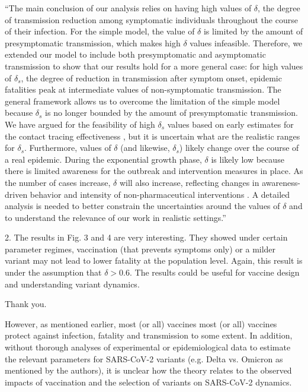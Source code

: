 \documentclass[12pt]{article}
\newcommand{\revtext}{\textsf}
\begin{document}
``The main conclusion of our analysis relies on having high values of $\delta$, the degree of transmission reduction among symptomatic individuals throughout the course of their infection.
For the simple model, the value of $\delta$ is limited by the amount of presymptomatic transmission, which makes high $\delta$ values infeasible.
Therefore, we extended our model to include both presymptomatic and asymptomatic transmission to show that our results hold for a more general case: for high values of $\delta_s$, the degree of reduction in transmission after symptom onset, epidemic fatalities peak at intermediate values of non-symptomatic transmission.
The general framework allows us to overcome the limitation of the simple model because $\delta_s$ is no longer bounded by the amount of presymptomatic transmission.
We have argued for the feasibility of high $\delta_s$ values based on early estimates for the contact tracing effectiveness \citep{kucharski2020effectiveness}, but it is uncertain what are the realistic ranges for $\delta_s$.
Furthermore, values of $\delta$ (and likewise, $\delta_s$) likely change over the course of a real epidemic.
During the exponential growth phase, $\delta$ is likely low because there is limited awareness for the outbreak and intervention measures in place.
As the number of cases increase, $\delta$ will also increase, reflecting changes in awareness-driven behavior and intensity of non-pharmaceutical interventions \citep{weitz2020awareness}.
A detailed analysis is needed to better constrain the uncertainties around the values of $\delta$ and to understand the relevance of our work in realistic settings.''

\revtext{2. The results in Fig. 3 and 4 are very interesting. They showed under certain parameter regimes, vaccination (that prevents symptoms only) or a milder variant may not lead to lower fatality at the population level. Again, this result is under the assumption that $\delta>0.6$. The results could be useful for vaccine design and understanding variant dynamics.}

Thank you.

\revtext{However, as mentioned earlier, most (or all) vaccines most (or all) vaccines protect against infection, fatality and transmission to some extent. In addition, without thorough analyses of experimental or epidemiological data to estimate the relevant parameters for SARS-CoV-2 variants (e.g. Delta vs. Omicron as mentioned by the authors), it is unclear how the theory relates to the observed impacts of vaccination and the selection of variants on SARS-CoV-2 dynamics.} 
\end{document}
